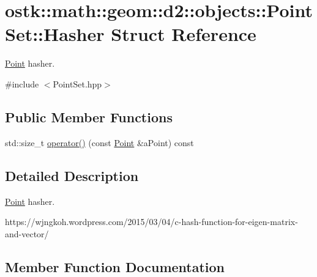 \hypertarget{structostk_1_1math_1_1geom_1_1d2_1_1objects_1_1_point_set_1_1_hasher}{}\section{ostk\+:\+:math\+:\+:geom\+:\+:d2\+:\+:objects\+:\+:Point\+Set\+:\+:Hasher Struct Reference}
\label{structostk_1_1math_1_1geom_1_1d2_1_1objects_1_1_point_set_1_1_hasher}


\hyperlink{classostk_1_1math_1_1geom_1_1d2_1_1objects_1_1_point}{Point} hasher.  




{\ttfamily \#include $<$Point\+Set.\+hpp$>$}

\subsection*{Public Member Functions}
\begin{DoxyCompactItemize}
\item 
std\+::size\+\_\+t \hyperlink{structostk_1_1math_1_1geom_1_1d2_1_1objects_1_1_point_set_1_1_hasher_ab30a3659c5939c4e46249ec8582f9d70}{operator()} (const \hyperlink{classostk_1_1math_1_1geom_1_1d2_1_1objects_1_1_point}{Point} \&a\+Point) const
\end{DoxyCompactItemize}


\subsection{Detailed Description}
\hyperlink{classostk_1_1math_1_1geom_1_1d2_1_1objects_1_1_point}{Point} hasher. 

https\+://wjngkoh.wordpress.\+com/2015/03/04/c-\/hash-\/function-\/for-\/eigen-\/matrix-\/and-\/vector/ 

\subsection{Member Function Documentation}
\mbox{\label{structostk_1_1math_1_1geom_1_1d2_1_1objects_1_1_point_set_1_1_hasher_ab30a3659c5939c4e46249ec8582f9d70}} 
